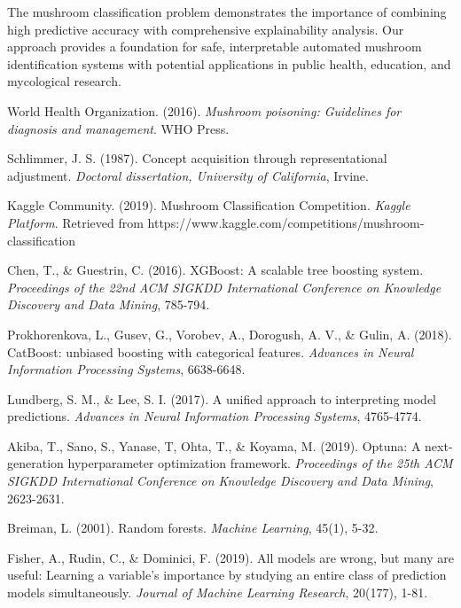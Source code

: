 \documentclass[11pt,a4paper]{article}
\begin{document}
The mushroom classification problem demonstrates the importance of combining high predictive accuracy with comprehensive explainability analysis. Our approach provides a foundation for safe, interpretable automated mushroom identification systems with potential applications in public health, education, and mycological research.

\begin{thebibliography}{9}

World Health Organization. (2016). \textit{Mushroom poisoning: Guidelines for diagnosis and management}. WHO Press.

Schlimmer, J. S. (1987). Concept acquisition through representational adjustment. \textit{Doctoral dissertation, University of California}, Irvine.

Kaggle Community. (2019). Mushroom Classification Competition. \textit{Kaggle Platform}. Retrieved from https://www.kaggle.com/competitions/mushroom-classification

Chen, T., \& Guestrin, C. (2016). XGBoost: A scalable tree boosting system. \textit{Proceedings of the 22nd ACM SIGKDD International Conference on Knowledge Discovery and Data Mining}, 785-794.

Prokhorenkova, L., Gusev, G., Vorobev, A., Dorogush, A. V., \& Gulin, A. (2018). CatBoost: unbiased boosting with categorical features. \textit{Advances in Neural Information Processing Systems}, 6638-6648.

Lundberg, S. M., \& Lee, S. I. (2017). A unified approach to interpreting model predictions. \textit{Advances in Neural Information Processing Systems}, 4765-4774.

Akiba, T., Sano, S., Yanase, T, Ohta, T., \& Koyama, M. (2019). Optuna: A next-generation hyperparameter optimization framework. \textit{Proceedings of the 25th ACM SIGKDD International Conference on Knowledge Discovery and Data Mining}, 2623-2631.

Breiman, L. (2001). Random forests. \textit{Machine Learning}, 45(1), 5-32.

Fisher, A., Rudin, C., \& Dominici, F. (2019). All models are wrong, but many are useful: Learning a variable's importance by studying an entire class of prediction models simultaneously. \textit{Journal of Machine Learning Research}, 20(177), 1-81.

\end{thebibliography}
\end{document}
